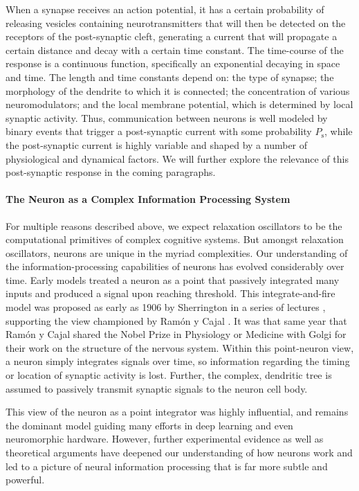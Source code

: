 When a synapse receives an action potential, it has a certain probability of releasing vesicles containing neurotransmitters that will then be detected on the receptors of the post-synaptic cleft, generating a current that will propagate a certain distance and decay with a certain time constant. The time-course of the response is a continuous function, specifically an exponential decaying in space and time. The length and time constants depend on: the type of synapse; the morphology of the dendrite to which it is connected; the concentration of various neuromodulators; and the local membrane potential, which is determined by local synaptic activity. Thus, communication between neurons is well modeled by binary events that trigger a post-synaptic current with some probability $P_{\mathrm{s}}$, while the post-synaptic current is highly variable and shaped by a number of physiological and dynamical factors. We will further explore the relevance of this post-synaptic response in the coming paragraphs. 

\paragraph{The Neuron as a Complex Information Processing System}
For multiple reasons described above, we expect relaxation oscillators to be the computational primitives of complex cognitive systems. But amongst relaxation oscillators, neurons are unique in the myriad complexities. Our understanding of the information-processing capabilities of neurons has evolved considerably over time. Early models treated a neuron as a point that passively integrated many inputs and produced a signal upon reaching threshold. This integrate-and-fire model was proposed as early as 1906 by Sherrington in a series of lectures \cite{sh1906}, supporting the view championed by Ram\'{o}n y Cajal \cite{ra1908}. It was that same year that Ram\'{o}n y Cajal shared the Nobel Prize in Physiology or Medicine with Golgi for their work on the structure of the nervous system. Within this point-neuron view, a neuron simply integrates signals over time, so information regarding the timing or location of synaptic activity is lost. Further, the complex, dendritic tree is assumed to passively transmit synaptic signals to the neuron cell body. 

This view of the neuron as a point integrator was highly influential, and remains the dominant model guiding many efforts in deep learning and even neuromorphic hardware. However, further experimental evidence as well as theoretical arguments have deepened our understanding of how neurons work and led to a picture of neural information processing that is far more subtle and powerful. 

